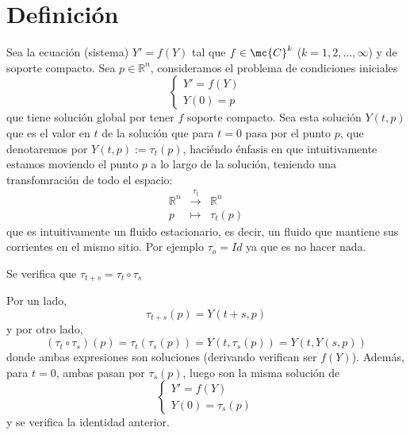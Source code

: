 \section{Definición}
Sea la ecuación (sistema) $Y'=f(Y)$ tal que $f \in \mc{C}^k$ ($k=1,2,\ldots, \infty$) y de soporte compacto. Sea $p \in \mathbb R^n$, consideramos el problema de condiciones iniciales
$$\left\{ \begin{array}{l}
     Y'=f(Y)  \\
     Y(0)=p
\end{array} \right.$$
que tiene solución global por tener $f$ soporte compacto. Sea esta solución $Y(t,p)$ que es el valor en $t$ de la solución que para $t=0$ pasa por el punto $p$, que denotaremos por $Y(t,p):=\tau_t(p)$, haciéndo énfasis en que intuitivamente estamos moviendo el punto $p$ a lo largo de la solución, teniendo una transfomración de todo el espacio:
 $$\begin{array}{rcl}
         \mathbb R^n  & \overset{\tau_t}{\longrightarrow} & \mathbb R^n  \\
         p & \longmapsto &\tau_t(p) 
    \end{array}$$
    que es intuitivamente un fluido estacionario, es decir, un fluido que mantiene sus corrientes en el mismo sitio. Por ejemplo $\tau_o=Id$ ya que es no hacer nada. 
    \begin{prop}
        Se verifica que $\tau_{t+s}=\tau_t \circ \tau_s$
    \end{prop}
    \begin{dem}
        Por un lado, 
        $$\tau_{t+s}(p)=Y(t+s,p)$$
        y por otro lado, 
        $$(\tau_t \circ \tau_s)(p)=\tau_t(\tau_s(p))=Y(t,\tau_s(p))=Y(t,Y(s,p))$$
        donde ambas expresiones son soluciones (derivando verifican ser $f(Y)$). Además, para $t=0$, ambas pasan por $\tau_s(p)$, luego son la misma solución de 
        $$\left\{ \begin{array}{l}
            Y'=f(Y)  \\
            Y(0)=\tau_s(p)
\end{array} \right.$$
        y se verifica la identidad anterior.
    \end{dem}
